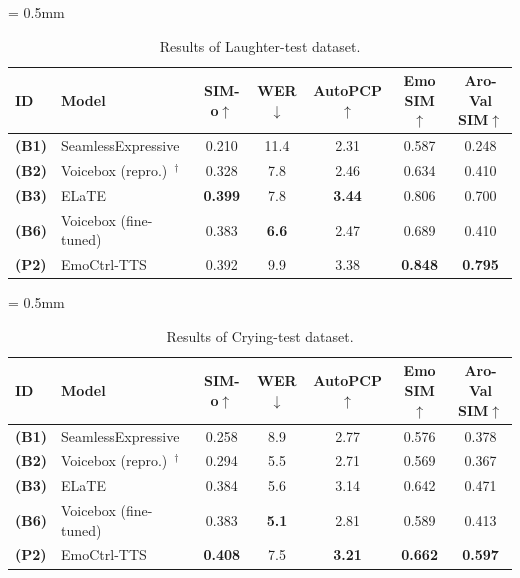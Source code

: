 \begin{table}[t]
\vspace{-3mm}
\caption{Results of Laughter-test dataset. }
\label{tab:laughter_test_results}
\centering
\resizebox{\columnwidth}{!}
{
\scriptsize
\tabcolsep = 0.5mm
\begin{tabular}{@{}llccccc@{}}
    \toprule
    \multirow{1}{*}{\textbf{ID}} & \multirow{1}{*}{\textbf{Model}} & \textbf{SIM-o$\uparrow$} & \textbf{WER$\downarrow$} & \textbf{AutoPCP$\uparrow$} & \textbf{Emo SIM$\uparrow$} & \textbf{Aro-Val SIM$\uparrow$} \\
    \midrule
    \textbf{(B1)} & SeamlessExpressive~\cite{barrault2023seamless}   & 0.210  & 11.4 & 2.31 & 0.587 & 0.248  \\
    \textbf{(B2)} & Voicebox (repro.)~\cite{le2024voicebox}$^\dagger$  & 0.328  & 7.8  & 2.46 & 0.634 & 0.410   \\
    \textbf{(B3)} & ELaTE~\cite{kanda2024making}              & {\bf 0.399}  & 7.8  & {\bf 3.44} & 0.806 & 0.700   \\
    \textbf{(B6)} & Voicebox (fine-tuned)                         & 0.383  & {\bf 6.6}  & 2.47 & 0.689 & 0.410   \\
    \textbf{(P2)} & EmoCtrl-TTS                               & 0.392  & 9.9  & 3.38 & {\bf 0.848} & {\bf 0.795}   \\   
    \bottomrule
\end{tabular}
}
\vspace{-5mm}
\end{table}

\begin{table}[t]
\caption{Results of Crying-test dataset. }
\label{tab:crying_test_results}
\centering
\resizebox{\columnwidth}{!}
{
\scriptsize
\tabcolsep = 0.5mm
\begin{tabular}{@{}llccccc@{}}
    \toprule
    \multirow{1}{*}{\textbf{ID}} & \multirow{1}{*}{\textbf{Model}} & \textbf{SIM-o$\uparrow$} & \textbf{WER$\downarrow$} & \textbf{AutoPCP$\uparrow$} & \textbf{Emo SIM$\uparrow$} & \textbf{Aro-Val SIM$\uparrow$} \\
    \midrule
    \textbf{(B1)} & SeamlessExpressive~\cite{barrault2023seamless}   & 0.258  & 8.9  & 2.77 & 0.576 & 0.378  \\
    \textbf{(B2)} & Voicebox (repro.)~\cite{le2024voicebox}$^\dagger$  & 0.294  & 5.5  & 2.71 & 0.569 & 0.367  \\
    \textbf{(B3)} & ELaTE~\cite{kanda2024making}              & 0.384  & 5.6  & 3.14 & 0.642 & 0.471  \\
    \textbf{(B6)} & Voicebox (fine-tuned)                         & 0.383  & {\bf 5.1}  & 2.81 & 0.589 & 0.413  \\
    \textbf{(P2)} & EmoCtrl-TTS                               & {\bf 0.408}  & 7.5  & {\bf 3.21} & {\bf 0.662} & {\bf 0.597}  \\   
    \bottomrule
\end{tabular}
}
\vspace{-5mm}
\end{table}

